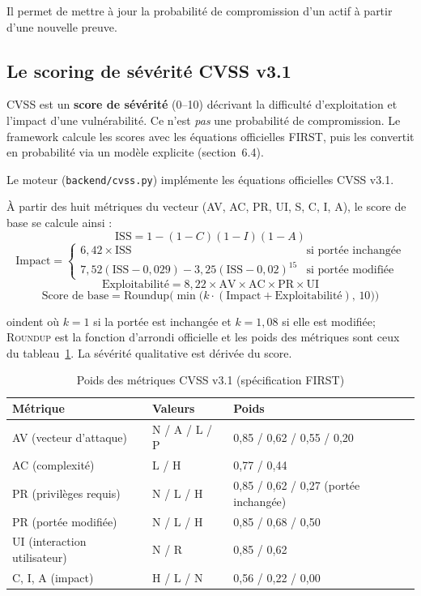 \documentclass[12pt,a4paper]{article}
\newcommand{\forcereset}[1]{}
\begin{document}
Il permet de mettre à jour la probabilité de compromission d'un actif à partir d'une nouvelle preuve.

\subsection{Le scoring de sévérité CVSS v3.1}
\forcereset{5}

\begin{defbox}
CVSS est un \textbf{score de sévérité} (0--10) décrivant la difficulté d'exploitation et l'impact d'une vulnérabilité. Ce n'est \emph{pas} une probabilité de compromission. Le framework calcule les scores avec les équations officielles FIRST, puis les convertit en probabilité via un modèle explicite (section~6.4).
\end{defbox}

Le moteur (\texttt{backend/cvss.py}) implémente les équations officielles CVSS v3.1.

À partir des huit métriques du vecteur (AV, AC, PR, UI, S, C, I, A), le score de base se calcule ainsi :
\[
\text{ISS} = 1 - (1-C)(1-I)(1-A)
\]
\[
\text{Impact} = 
\begin{cases}
6{,}42 \times \text{ISS} & \text{si portée inchangée} \\[2pt]
7{,}52(\text{ISS}-0{,}029) - 3{,}25(\text{ISS}-0{,}02)^{15} & \text{si portée modifiée}
\end{cases}
\]
\[
\text{Exploitabilité} = 8{,}22 \times \text{AV} \times \text{AC} \times \text{PR} \times \text{UI}
\]
\[
\text{Score de base} = \text{Roundup}\!\Big(\min\big(k \cdot (\text{Impact} + \text{Exploitabilité}),\, 10\big)\Big)
\]

oindent où $k = 1$ si la portée est inchangée et $k = 1{,}08$ si elle est modifiée; \textsc{Roundup} est la fonction d'arrondi officielle et les poids des métriques sont ceux du tableau~\ref{tab:cvss-weights}. La sévérité qualitative est dérivée du score.

\begin{table}[H]
\centering
\caption{Poids des métriques CVSS v3.1 (spécification FIRST)}
\label{tab:cvss-weights}
\begin{tabular}{lll}
\toprule
\textbf{Métrique} & \textbf{Valeurs} & \textbf{Poids} \\
\midrule
AV (vecteur d'attaque) & N / A / L / P & 0,85 / 0,62 / 0,55 / 0,20 \\
AC (complexité) & L / H & 0,77 / 0,44 \\
PR (privilèges requis) & N / L / H & 0,85 / 0,62 / 0,27 (portée inchangée) \\
PR (portée modifiée) & N / L / H & 0,85 / 0,68 / 0,50 \\
UI (interaction utilisateur) & N / R & 0,85 / 0,62 \\
C, I, A (impact) & H / L / N & 0,56 / 0,22 / 0,00 \\
\bottomrule
\end{tabular}
\end{table}
\end{document}

